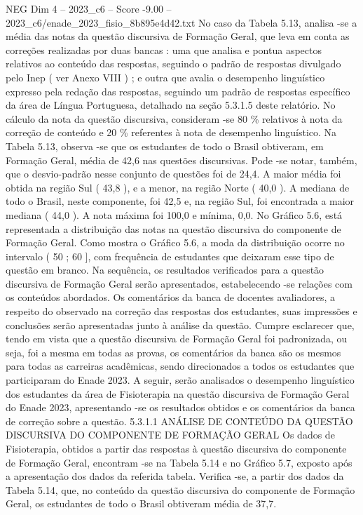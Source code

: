\begin{textsample}{NEG Dim 4 – 2023\_c6 – Score -9.00 – 2023\_c6/enade\_2023\_fisio\_8b895e4d42.txt}
No caso da Tabela 5.13, analisa -se a média das notas da questão discursiva de Formação Geral, que leva em conta as correções realizadas por duas bancas : uma que analisa e pontua aspectos relativos ao conteúdo das respostas, seguindo o padrão de respostas divulgado pelo Inep ( ver Anexo VIII ) ; e outra que avalia o desempenho linguístico expresso pela redação das respostas, seguindo um padrão de respostas específico da área de Língua Portuguesa, detalhado na seção 5.3.1.5 deste relatório.
No cálculo da nota da questão discursiva, consideram -se 80 \% relativos à nota da correção de conteúdo e 20 \% referentes à nota de desempenho linguístico.
Na Tabela 5.13, observa -se que os estudantes de todo o Brasil obtiveram, em Formação Geral, média de 42,6 nas questões discursivas.
Pode -se notar, também, que o desvio-padrão nesse conjunto de questões foi de 24,4.
A maior média foi obtida na região Sul ( 43,8 ), e a menor, na região Norte ( 40,0 ).
A mediana de todo o Brasil, neste componente, foi 42,5 e, na região Sul, foi encontrada a maior mediana ( 44,0 ).
A nota máxima foi 100,0 e mínima, 0,0.
No Gráfico 5.6, está representada a distribuição das notas na questão discursiva do componente de Formação Geral.
Como mostra o Gráfico 5.6, a moda da distribuição ocorre no intervalo ( 50 ; 60 ], com frequência de estudantes que deixaram esse tipo de questão em branco.
Na sequência, os resultados verificados para a questão discursiva de Formação Geral serão apresentados, estabelecendo -se relações com os conteúdos abordados.
Os comentários da banca de docentes avaliadores, a respeito do observado na correção das respostas dos estudantes, suas impressões e conclusões serão apresentadas junto à análise da questão.
Cumpre esclarecer que, tendo em vista que a questão discursiva de Formação Geral foi padronizada, ou seja, foi a mesma em todas as provas, os comentários da banca são os mesmos para todas as carreiras acadêmicas, sendo direcionados a todos os estudantes que participaram do Enade 2023.
A seguir, serão analisados o desempenho linguístico dos estudantes da área de Fisioterapia na questão discursiva de Formação Geral do Enade 2023, apresentando -se os resultados obtidos e os comentários da banca de correção sobre a questão. 5.3.1.1 ANÁLISE DE CONTEÚDO DA QUESTÃO DISCURSIVA DO COMPONENTE DE FORMAÇÃO GERAL Os dados de Fisioterapia, obtidos a partir das respostas à questão discursiva do componente de Formação Geral, encontram -se na Tabela 5.14 e no Gráfico 5.7, exposto após a apresentação dos dados da referida tabela.
Verifica -se, a partir dos dados da Tabela 5.14, que, no conteúdo da questão discursiva do componente de Formação Geral, os estudantes de todo o Brasil obtiveram média de 37,7.

\end{textsample}
